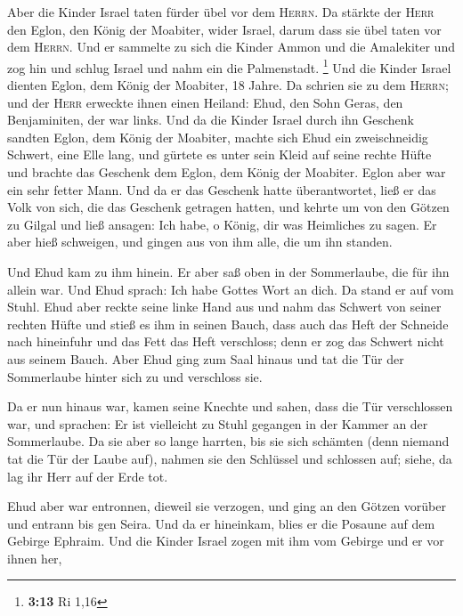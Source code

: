  Aber die Kinder Israel taten fürder übel vor dem
\textsc{Herrn}. Da stärkte der \textsc{Herr} den Eglon, den König der
Moabiter, wider Israel, darum dass sie übel taten vor dem
\textsc{Herrn}.  Und er sammelte zu sich die Kinder Ammon
und die Amalekiter und zog hin und schlug Israel und nahm ein die
Palmenstadt. \footnote{\textbf{3:13} Ri 1,16}  Und die
Kinder Israel dienten Eglon, dem König der Moabiter, 18 Jahre.
 Da schrien sie zu dem \textsc{Herrn}; und der
\textsc{Herr} erweckte ihnen einen Heiland: Ehud, den Sohn Geras, den
Benjaminiten, der war links. Und da die Kinder Israel durch ihn Geschenk
sandten Eglon, dem König der Moabiter,  machte sich Ehud
ein zweischneidig Schwert, eine Elle lang, und gürtete es unter sein
Kleid auf seine rechte Hüfte  und brachte das Geschenk
dem Eglon, dem König der Moabiter. Eglon aber war ein sehr fetter Mann.
 Und da er das Geschenk hatte überantwortet, ließ er das
Volk von sich, die das Geschenk getragen hatten,  und
kehrte um von den Götzen zu Gilgal und ließ ansagen: Ich habe, o König,
dir was Heimliches zu sagen. Er aber hieß schweigen, und gingen aus von
ihm alle, die um ihn standen.

 Und Ehud kam zu ihm hinein. Er aber saß oben in der
Sommerlaube, die für ihn allein war. Und Ehud sprach: Ich habe Gottes
Wort an dich. Da stand er auf vom Stuhl.  Ehud aber
reckte seine linke Hand aus und nahm das Schwert von seiner rechten
Hüfte und stieß es ihm in seinen Bauch,  dass auch das
Heft der Schneide nach hineinfuhr und das Fett das Heft verschloss; denn
er zog das Schwert nicht aus seinem Bauch.  Aber Ehud
ging zum Saal hinaus und tat die Tür der Sommerlaube hinter sich zu und
verschloss sie.

 Da er nun hinaus war, kamen seine Knechte und sahen,
dass die Tür verschlossen war, und sprachen: Er ist vielleicht zu Stuhl
gegangen in der Kammer an der Sommerlaube.  Da sie aber
so lange harrten, bis sie sich schämten (denn niemand tat die Tür der
Laube auf), nahmen sie den Schlüssel und schlossen auf; siehe, da lag
ihr Herr auf der Erde tot.

 Ehud aber war entronnen, dieweil sie verzogen, und ging
an den Götzen vorüber und entrann bis gen Seira.  Und da
er hineinkam, blies er die Posaune auf dem Gebirge Ephraim. Und die
Kinder Israel zogen mit ihm vom Gebirge und er vor ihnen her,


